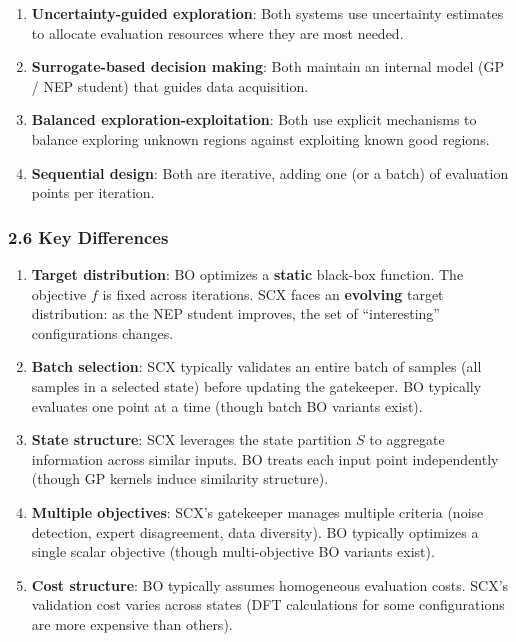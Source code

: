 \documentclass[
  12pt,
]{ctexart}
\providecommand{\tightlist}{%
  \setlength{\itemsep}{0pt}\setlength{\parskip}{0pt}}
\begin{document}
\begin{enumerate}
\def\labelenumi{\arabic{enumi}.}
\tightlist
\item
  \textbf{Uncertainty-guided exploration}: Both systems use uncertainty
  estimates to allocate evaluation resources where they are most needed.
\item
  \textbf{Surrogate-based decision making}: Both maintain an internal
  model (GP / NEP student) that guides data acquisition.
\item
  \textbf{Balanced exploration-exploitation}: Both use explicit
  mechanisms to balance exploring unknown regions against exploiting
  known good regions.
\item
  \textbf{Sequential design}: Both are iterative, adding one (or a
  batch) of evaluation points per iteration.
\end{enumerate}

\subsubsection{2.6 Key Differences}\label{key-differences-1}

\begin{enumerate}
\def\labelenumi{\arabic{enumi}.}
\item
  \textbf{Target distribution}: BO optimizes a \textbf{static} black-box
  function. The objective \(f\) is fixed across iterations. SCX faces an
  \textbf{evolving} target distribution: as the NEP student improves,
  the set of ``interesting'' configurations changes.
\item
  \textbf{Batch selection}: SCX typically validates an entire batch of
  samples (all samples in a selected state) before updating the
  gatekeeper. BO typically evaluates one point at a time (though batch
  BO variants exist).
\item
  \textbf{State structure}: SCX leverages the state partition \(S\) to
  aggregate information across similar inputs. BO treats each input
  point independently (though GP kernels induce similarity structure).
\item
  \textbf{Multiple objectives}: SCX's gatekeeper manages multiple
  criteria (noise detection, expert disagreement, data diversity). BO
  typically optimizes a single scalar objective (though multi-objective
  BO variants exist).
\item
  \textbf{Cost structure}: BO typically assumes homogeneous evaluation
  costs. SCX's validation cost varies across states (DFT calculations
  for some configurations are more expensive than others).
\end{enumerate}
\end{document}
